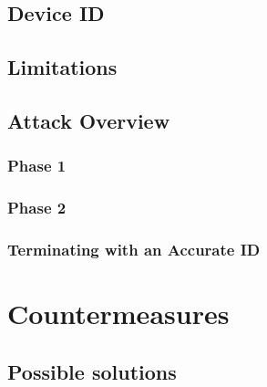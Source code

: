 \documentclass{report}
\begin{document}
\section{Device ID}
\label{sec:device id}

\section{Limitations}
\label{sec:limitations}

\section{Attack Overview}

\subsection{Phase 1}
\label{sec:phase 1}

\begin{center}
    \begin{minipage}[t]{0.5\textwidth}
      \vspace{0cm}
      
      
    \end{minipage}
\end{center}


\subsection{Phase 2}
\label{sec:phase 2}

\subsection{Terminating with an Accurate ID}
\label{sec:terminating with an accurate id}

\vspace{0.5cm}
\chapter{Countermeasures}
\label{sec:countermeasures}

\section{Possible solutions}
\label{sec:possible solutions}
\end{document}
